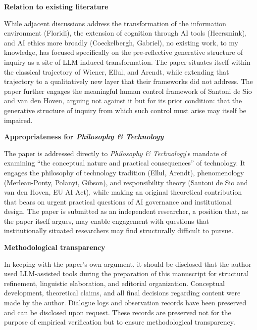 \documentclass[12pt]{article}
\begin{document}
\bigskip

\noindent\textbf{Relation to existing literature}

While adjacent discussions address the transformation of the information environment (Floridi), the extension of cognition through AI tools (Heersmink), and AI ethics more broadly (Coeckelbergh, Gabriel), no existing work, to my knowledge, has focused specifically on the pre-reflective generative structure of inquiry as a site of LLM-induced transformation. The paper situates itself within the classical trajectory of Wiener, Ellul, and Arendt, while extending that trajectory to a qualitatively new layer that their frameworks did not address. The paper further engages the meaningful human control framework of Santoni de Sio and van den Hoven, arguing not against it but for its prior condition: that the generative structure of inquiry from which such control must arise may itself be impaired.

\bigskip

\noindent\textbf{Appropriateness for \textit{Philosophy \& Technology}}

The paper is addressed directly to \textit{Philosophy \& Technology}'s mandate of examining ``the conceptual nature and practical consequences'' of technology. It engages the philosophy of technology tradition (Ellul, Arendt), phenomenology (Merleau-Ponty, Polanyi, Gibson), and responsibility theory (Santoni de Sio and van den Hoven, EU AI Act), while making an original theoretical contribution that bears on urgent practical questions of AI governance and institutional design. The paper is submitted as an independent researcher, a position that, as the paper itself argues, may enable engagement with questions that institutionally situated researchers may find structurally difficult to pursue.

\bigskip

\noindent\textbf{Methodological transparency}

In keeping with the paper's own argument, it should be disclosed that the author used LLM-assisted tools during the preparation of this manuscript for structural refinement, linguistic elaboration, and editorial organization. Conceptual development, theoretical claims, and all final decisions regarding content were made by the author. Dialogue logs and observation records have been preserved and can be disclosed upon request. These records are preserved not for the purpose of empirical verification but to ensure methodological transparency.
\end{document}
